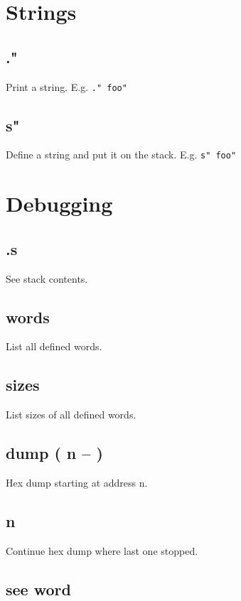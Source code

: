 \section{Strings}

\subsection{."}

Print a string. E.g. \texttt{." foo"}

\subsection{s"}

Define a string and put it on the stack. E.g. \texttt{s" foo"}


\section{Debugging}

\subsection{.s}

See stack contents.

\subsection{words}

List all defined words.

\subsection{sizes}

List sizes of all defined words.

\subsection{dump ( n -- )}

Hex dump starting at address n.

\subsection{n}

Continue hex dump where last one stopped.

\subsection{see word}

